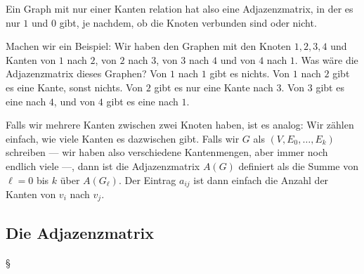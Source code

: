 \begin{spoken-clean}[00:28:30 - 00:31:12]
Ein Graph mit nur einer Kanten relation hat also eine Adjazenzmatrix, in der es nur $1$ und $0$ gibt, je nachdem, ob die Knoten verbunden sind oder nicht.

Machen wir ein Beispiel: Wir haben den Graphen mit den Knoten $1, 2, 3, 4$ und Kanten von $1$ nach $2$, von $2$ nach $3$, von $3$ nach $4$ und von $4$ nach $1$. Was wäre die Adjazenzmatrix dieses Graphen? Von $1$ nach $1$ gibt es nichts. Von $1$ nach $2$ gibt es eine Kante, sonst nichts. Von $2$ gibt es nur eine Kante nach $3$. Von $3$ gibt es eine nach $4$, und von $4$ gibt es eine nach $1$.

Falls wir mehrere Kanten zwischen zwei Knoten haben, ist es analog: Wir zählen einfach, wie viele Kanten es dazwischen gibt. Falls wir $G$ als $(V, E_0, \dots, E_k)$ schreiben --- wir haben also verschiedene Kantenmengen, aber immer noch endlich viele ---, dann ist die Adjazenzmatrix $A(G)$ definiert als die Summe von $\ell = 0$ bis $k$ über $A(G_\ell)$. Der Eintrag $a_{ij}$ ist dann einfach die Anzahl der Kanten von $v_i$ nach $v_j$.
\end{spoken-clean}

\subsection{Die Adjazenzmatrix}§

